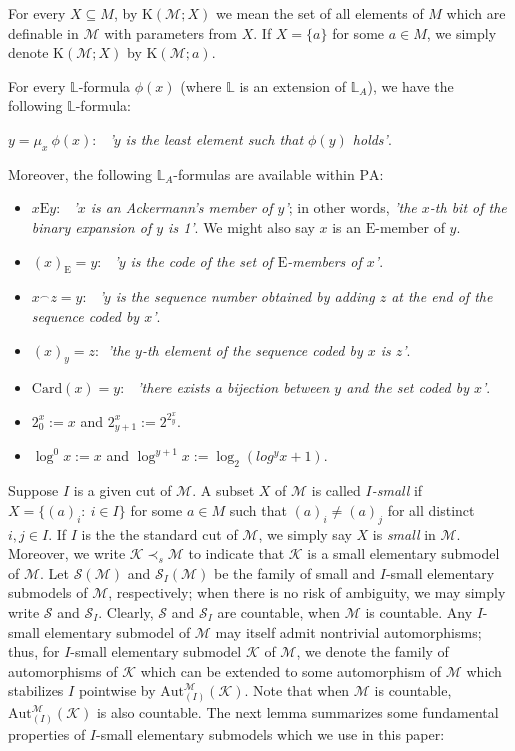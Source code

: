 \documentclass[11pt]{article}
\theoremstyle{plain}
\theoremstyle{definition}
\newcommand{\M}{\mathcal{M}}
\newcommand{\K}{\mathcal{K}}
\newcommand{\E}{\mathrm{E}}
\newcommand{\A}{\mathrm{Aut}}
\newcommand{\Aa}{\A_{(I)}^{\M}(\K)}
\newcommand{\pa}{\mathrm{PA}}
\newcommand{\KK}{\mathrm{K}}
\begin{document}
  For every $ X\subseteq M $, by $\KK(\M;X)$ we mean the set of all elements of $M$ which are definable in $\M$ with parameters from $X$. If $X=\{a\}$ for some $a\in M$, we simply denote $\KK(\M;X)$ by $\KK(\M;a)$. 

For every $\mathbb{L}$-formula $\phi(x) $ (where $\mathbb{L}$ is an extension of $\mathbb{L}_{A}$), we have the following $\mathbb{L}$-formula:
\begin{center}
	$y=\mu_{x} \ \phi(x): \ \ $ \textit{'$y$ is the least element such that $\phi(y)$ holds'}.
\end{center}
Moreover, the following  $\mathbb{L}_{A}$-formulas are available within $\pa$:
\begin{center}
\begin{itemize}
\item $x\E y: \ \ $ \textit{'$x$ is an Ackermann's member of $y$'}; in other words, \textit{'the $x$-th bit of the binary expansion of $y$ is 1'}. We might also say $x$ is an $\E$-member of $y$.
\item $(x)_{\E}=y: \ \ $ \textit{'$y$ is the code of the set of $\E$-members of $x$'}.
\item $x^{\frown}z=y: \ \ $ \textit{'$y$ is the sequence number obtained by adding $z$ at the end of the sequence coded by $x$'}.
\item $(x)_{y}=z: \ \ $\textit{'the $y$-th element of the sequence coded by $x$ is $z$'}.
\item $\mathrm{Card}(x)=y: \ \ $ \textit{'there exists a bijection between $y$ and the set coded by $x$'}.
\item 	$2_{0}^{x}:=x$ and
$2_{y+1}^{x}:=2^{2_{y}^{x}}$.
\item $\log^{0}x:=x$ and $\log^{y+1}x:=\log_{2}(log^{y}x+1)$.
\end{itemize}
\end{center} 
Suppose $I$ is a given cut of $\M$. A subset $X$ of $\M$ is called \textit{$I$-small} if $X=\{(a)_{i}: \ i\in I\}$ for some $a\in M$ such that $(a)_{i}\neq(a)_{j}$ for all distinct $i,j\in I$. If $I$ is the the standard cut of $\M$, we simply say $X$ is \textit{small} in $\M$.  Moreover,
we write $ \K\prec_{s}\M $ to indicate  that $ \K $ is a small elementary submodel of $ \M $.  Let $ \mathcal{S}(\M) $ and $\mathcal{S}_{I}(\M)$ be the family of small and $I$-small elementary submodels of $\M$, respectively; when there is no risk of ambiguity, we may simply write $\mathcal{S}$ and $\mathcal{S}_{I}$. Clearly,  $\mathcal{S} $ and $\mathcal{S}_{I}$ are countable, when $\M$ is countable. Any $I$-small elementary submodel of $\M$ may itself admit nontrivial automorphisms; thus,  for $I$-small elementary submodel  $ \K $ of $\M$, we  denote the family of automorphisms of $ \K $ which  can be extended to some automorphism of $ \M $ which stabilizes $I$ pointwise by $ \Aa $. Note that when $\M$ is countable, $\Aa$ is also countable. The next lemma summarizes some fundamental properties of $I$-small elementary submodels which we use in this paper:
\end{document}
